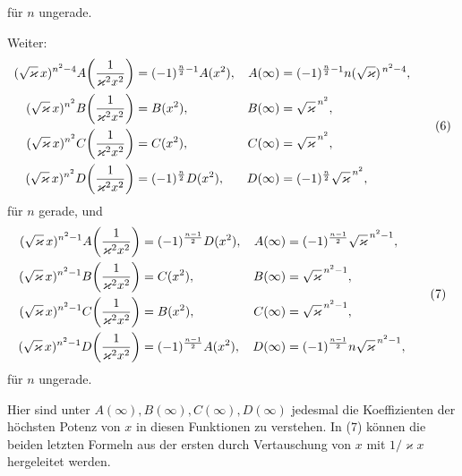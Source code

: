 \documentclass[11pt]{article}
\begin{document}
für $n$ ungerade.

Weiter:
\begin{equation}
\begin{aligned}
(\sqrt{\varkappa}\,x)^{n^2-4}A\!\left({1\over\varkappa^2x^2}\right)
&=(-1)^{\frac n2-1}A(x^2),&
A(\infty)&=(-1)^{\frac n2-1}n(\sqrt{\varkappa})^{\,n^2-4},\\
(\sqrt{\varkappa}\,x)^{n^2}B\!\left({1\over\varkappa^2x^2}\right)
&=B(x^2),&
B(\infty)&=\sqrt{\varkappa}^{\,n^2},\\
(\sqrt{\varkappa}\,x)^{n^2}C\!\left({1\over\varkappa^2x^2}\right)
&=C(x^2),&
C(\infty)&=\sqrt{\varkappa}^{\,n^2},\\
(\sqrt{\varkappa}\,x)^{n^2}D\!\left({1\over\varkappa^2x^2}\right)
&=(-1)^{\frac n2}D(x^2),&
D(\infty)&=(-1)^{\frac n2}\sqrt{\varkappa}^{\,n^2},
\end{aligned}
\tag{6}
\end{equation}
für $n$ gerade, und
\begin{equation}
\begin{aligned}
(\sqrt{\varkappa}\,x)^{n^2-1}A\!\left({1\over\varkappa^2x^2}\right)
&=(-1)^{\frac{n-1}{2}}D(x^2),&
A(\infty)&=(-1)^{\frac{n-1}{2}}\sqrt{\varkappa}^{\,n^2-1},\\
(\sqrt{\varkappa}\,x)^{n^2-1}B\!\left({1\over\varkappa^2x^2}\right)
&=C(x^2),&
B(\infty)&=\sqrt{\varkappa}^{\,n^2-1},\\
(\sqrt{\varkappa}\,x)^{n^2-1}C\!\left({1\over\varkappa^2x^2}\right)
&=B(x^2),&
C(\infty)&=\sqrt{\varkappa}^{\,n^2-1},\\
(\sqrt{\varkappa}\,x)^{n^2-1}D\!\left({1\over\varkappa^2x^2}\right)
&=(-1)^{\frac{n-1}{2}}A(x^2),&
D(\infty)&=(-1)^{\frac{n-1}{2}}n\sqrt{\varkappa}^{\,n^2-1},
\end{aligned}
\tag{7}
\end{equation}
für $n$ ungerade.

Hier sind unter $A(\infty),B(\infty),C(\infty),D(\infty)$ jedesmal die Koeffizienten der
höchsten Potenz von $x$ in diesen Funktionen zu verstehen. In (7) können die beiden
letzten Formeln aus der ersten durch Vertauschung von $x$ mit $1/\varkappa x$ hergeleitet
werden.
\end{document}
